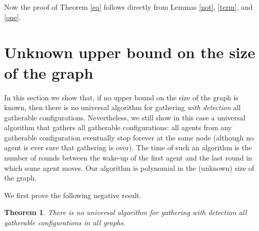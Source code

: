 \documentclass[11pt]{article}
\newtheorem{theorem}{Theorem}[section]
\begin{document}
Now the proof of Theorem \ref{eq} follows directly from Lemmas  \ref{not}, \ref{term},  and \ref{one}. 
 

 
 
 
 
 
 
 
 
 

 


\section{Unknown upper bound on the size of the graph}

In this section we show that, if no upper bound on the size of the graph is known, then there is no universal algorithm for gathering
{\em with detection} all gatherable configurations. Nevertheless, we still show in this case a universal algorithm that gathers all gatherable configurations:
all agents from any gatherable configuration eventually stop forever at the same node (although no agent is ever sure
that gathering is over). The time of such an algorithm is the number of rounds between the wake-up of the first agent and the last round in which some agent moves.
Our algorithm is polynomial in the (unknown) size of the graph.


We first prove the following negative result.

\begin{theorem}\label{no}
There is no universal algorithm for gathering with detection all gatherable configurations in all graphs. 
\end{theorem}
\end{document}
